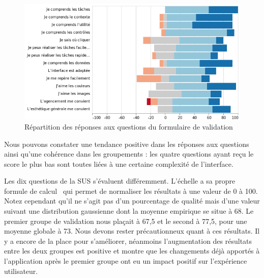 \documentclass{EPL-master-thesis-covers-FR}
\begin{document}
				\begin{figure}
					\includegraphics[width=\textwidth]{images/likert_questions}
					\caption{Répartition des réponses aux questions du formulaire de validation}
					\label{fig:validation_likert}
				\end{figure}

				Nous pouvons constater une tendance positive dans les réponses aux questions ainsi qu'une cohérence dans les groupements : les quatre questions ayant reçu le score le plus bas sont toutes liées à une certaine complexité de l'interface.

				Les dix questions de la SUS s'évaluent différemment. L'échelle a sa propre formule de calcul~\cite{ref:sus} qui permet de normaliser les résultats à une valeur de 0 à 100. Notez cependant qu'il ne s'agit pas d'un pourcentage de qualité mais d'une valeur suivant une distribution gaussienne dont la moyenne empirique se situe à 68. Le premier groupe de validation nous plaçait à 67,5 et le second à 77,5, pour une moyenne globale à 73. Nous devons rester précautionneux quant à ces résultats. Il y a encore de la place pour s'améliorer, néanmoins l'augmentation des résultats entre les deux groupes est positive et montre que les changements déjà apportés à l'application après le premier groupe ont eu un impact positif sur l'expérience utilisateur.
\end{document}
